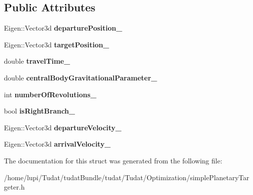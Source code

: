 \subsection*{Public Attributes}
\begin{DoxyCompactItemize}
\item 
Eigen\+::\+Vector3d {\bfseries departure\+Position\+\_\+}\hypertarget{structtudat_1_1optimization_1_1AnalyticalSimplePlanetaryTargeter_aaf147e038b7f3d1e6ba54f7fbc5d2149}{}\label{structtudat_1_1optimization_1_1AnalyticalSimplePlanetaryTargeter_aaf147e038b7f3d1e6ba54f7fbc5d2149}

\item 
Eigen\+::\+Vector3d {\bfseries target\+Position\+\_\+}\hypertarget{structtudat_1_1optimization_1_1AnalyticalSimplePlanetaryTargeter_a5c914327c9bbf52bda56ea2ce8a8323a}{}\label{structtudat_1_1optimization_1_1AnalyticalSimplePlanetaryTargeter_a5c914327c9bbf52bda56ea2ce8a8323a}

\item 
double {\bfseries travel\+Time\+\_\+}\hypertarget{structtudat_1_1optimization_1_1AnalyticalSimplePlanetaryTargeter_a256a1b2b64a3a3894820e4d4ec087941}{}\label{structtudat_1_1optimization_1_1AnalyticalSimplePlanetaryTargeter_a256a1b2b64a3a3894820e4d4ec087941}

\item 
double {\bfseries central\+Body\+Gravitational\+Parameter\+\_\+}\hypertarget{structtudat_1_1optimization_1_1AnalyticalSimplePlanetaryTargeter_a1f58d026ab9012383a2dd7a8c2f6efb5}{}\label{structtudat_1_1optimization_1_1AnalyticalSimplePlanetaryTargeter_a1f58d026ab9012383a2dd7a8c2f6efb5}

\item 
int {\bfseries number\+Of\+Revolutions\+\_\+}\hypertarget{structtudat_1_1optimization_1_1AnalyticalSimplePlanetaryTargeter_ab822a954d9e951814dba3cb29f04acca}{}\label{structtudat_1_1optimization_1_1AnalyticalSimplePlanetaryTargeter_ab822a954d9e951814dba3cb29f04acca}

\item 
bool {\bfseries is\+Right\+Branch\+\_\+}\hypertarget{structtudat_1_1optimization_1_1AnalyticalSimplePlanetaryTargeter_aa717121492d1b1c00ea5f48e6d225eb6}{}\label{structtudat_1_1optimization_1_1AnalyticalSimplePlanetaryTargeter_aa717121492d1b1c00ea5f48e6d225eb6}

\item 
Eigen\+::\+Vector3d {\bfseries departure\+Velocity\+\_\+}\hypertarget{structtudat_1_1optimization_1_1AnalyticalSimplePlanetaryTargeter_a7d817ed953a4e3238051ec9af5252196}{}\label{structtudat_1_1optimization_1_1AnalyticalSimplePlanetaryTargeter_a7d817ed953a4e3238051ec9af5252196}

\item 
Eigen\+::\+Vector3d {\bfseries arrival\+Velocity\+\_\+}\hypertarget{structtudat_1_1optimization_1_1AnalyticalSimplePlanetaryTargeter_af38673dc06864d4b1e94b81ce6520a3a}{}\label{structtudat_1_1optimization_1_1AnalyticalSimplePlanetaryTargeter_af38673dc06864d4b1e94b81ce6520a3a}

\end{DoxyCompactItemize}


The documentation for this struct was generated from the following file\+:\begin{DoxyCompactItemize}
\item 
/home/lupi/\+Tudat/tudat\+Bundle/tudat/\+Tudat/\+Optimization/simple\+Planetary\+Targeter.\+h\end{DoxyCompactItemize}
